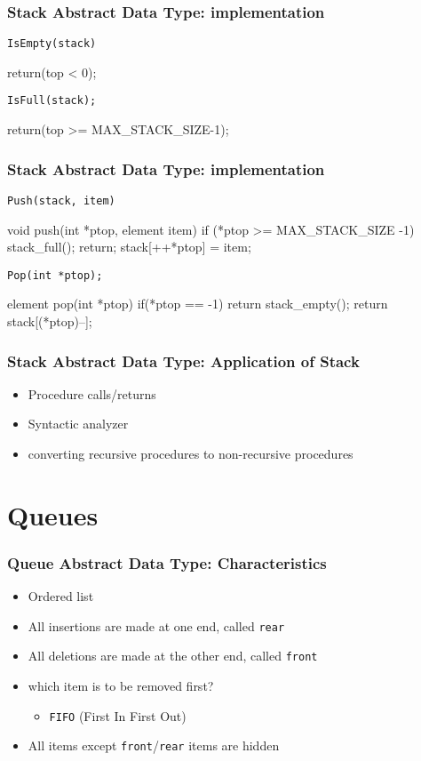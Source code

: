 \documentclass[newPxFont,sthlmFooter,nooffset]{beamer}
\begin{document}
\begin{frame}[t, fragile]
  \frametitle{Stack Abstract Data Type: implementation}
\texttt{IsEmpty(stack)}
  \begin{codedef}
    return(top < 0);
  \end{codedef}

\texttt{IsFull(stack);}

  \begin{codedef}
    return(top >= MAX_STACK_SIZE-1);
  \end{codedef}

\end{frame}


\begin{frame}[t, fragile]
  \frametitle{Stack Abstract Data Type: implementation}
\texttt{Push(stack, item)}

  \begin{codedef}
void push(int *ptop, element item){
    if (*ptop >= MAX_STACK_SIZE -1) {
       stack_full();
       return;
    }
    stack[++*ptop] = item;    
}
  \end{codedef}


\texttt{Pop(int *ptop);}

  \begin{codedef}
element pop(int *ptop){
    if(*ptop == -1)
        return stack_empty();
    return stack[(*ptop)--];
}
  \end{codedef}

\end{frame}


\begin{frame}[t]
  \frametitle{Stack Abstract Data Type: Application of Stack}
  \begin{itemize}
  \item Procedure calls/returns
  \item Syntactic analyzer
  \item converting recursive procedures to non-recursive procedures
  \end{itemize}
\end{frame}




\section{Queues} 
\begin{frame}[t]
  \frametitle{Queue Abstract Data Type: Characteristics}
  \begin{itemize}
  \item Ordered list
  \item All insertions are made at one end, called \texttt{rear}
  \item All deletions are made at the other end, called \texttt{front}
  \item which item is to be removed first?
    \begin{itemize}
    \item \texttt{FIFO} (First In First Out)
    \end{itemize}
  \item All items except \texttt{front}/\texttt{rear} items are hidden
  \end{itemize}
\end{frame}
\end{document}
